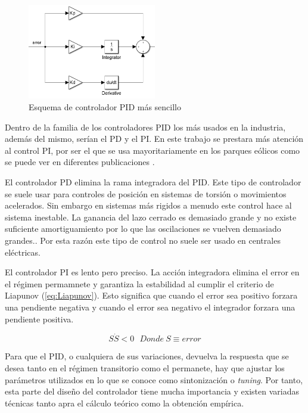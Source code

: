 \documentclass{book}
\begin{document}
\begin{figure}[h!]
\centering
\includegraphics[width=0.5\textwidth]{EsquemaPID.PNG}
\caption{Esquema de controlador PID m\'as sencillo}
\label{EsquemaPID}
\end{figure}\par

Dentro de la familia de los controladores PID los m\'as usados en la industria, adem\'as del mismo, ser\'ian el PD y el PI. En este trabajo se prestara m\'as atenci\'on al control PI, por ser el que se usa mayoritariamente en los parques e\'olicos como se puede ver en diferentes publicaciones \cite{WindFarmController, PI_QV, SPControl, ExamplePI, ExamplePI1}. \par

El controlador PD elimina la rama integradora del PID. Este tipo de controlador se suele usar para controles de posici\'on en sistemas de torsi\'on o movimientos acelerados. Sin embargo en sistemas m\'as rigidos a menudo este control hace al sistema inestable. La ganancia del lazo cerrado es demasiado grande y no existe suficiente amortiguamiento por lo que las oscilaciones se vuelven demasiado grandes.\cite{PDanalysis}. Por esta raz\'on este tipo de control no suele ser usado en centrales el\'ectricas. \par

El controlador PI es lento pero preciso. La acci\'on integradora elimina el error en el r\'egimen permamnete y garantiza la estabilidad al cumplir el criterio de Liapunov (\ref{eq:Liapunov}). Esto significa que cuando el error sea positivo forzara una pendiente negativa y cuando el error sea negativo el integrador forzara una pendiente positiva. \par

\begin{equation}\label{eq:Liapunov}
	S\dot S < 0 \ \ \ Donde \ S\equiv error
\end{equation} \par

Para que el PID, o cualquiera de sus variaciones, devuelva la respuesta que se desea tanto en el r\'egimen transitorio como el permanete, hay que ajustar los par\'ametros utilizados en lo que se conoce como sintonizaci\'on o \emph{tuning}. Por tanto, esta parte del diseño del controlador tiene mucha importancia y existen variadas t\'ecnicas tanto apra el c\'alculo te\'orico como la obtenci\'on emp\'irica. \par
\end{document}
